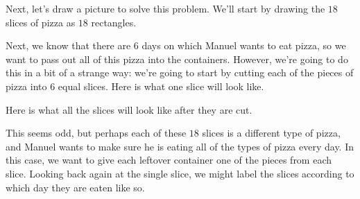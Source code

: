 \documentclass{ximera}
\begin{document}
\begin{example}
Next, let's draw a picture to solve this problem. We'll start by drawing the $18$ slices of pizza as $18$ rectangles.
\begin{image}
\end{image}

Next, we know that there are $6$ days on which Manuel wants to eat pizza, so we want to pass out all of this pizza into the containers. However, we're going to do this in a bit of a strange way: we're going to start by cutting each of the pieces of pizza into $6$ equal slices. Here is what one slice will look like.
\begin{image}
\end{image}

Here is what all the slices will look like after they are cut.

\begin{image}
\end{image}

This seems odd, but perhaps each of these $18$ slices is a different type of pizza, and Manuel wants to make sure he is eating all of the types of pizza every day. In this case, we want to give each leftover container one of the pieces from each slice. Looking back again at the single slice, we might label the slices according to which day they are eaten like so.


\end{example}
\end{document}
